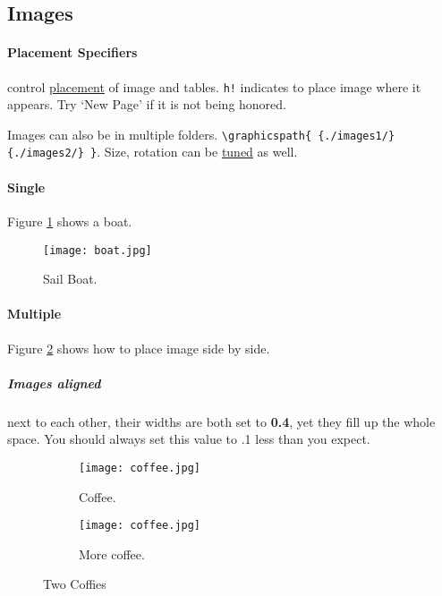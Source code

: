 \documentclass{report}[a4paper,12pt] %
\begin{document}
\newpage
\subsection{Images}

\paragraph{Placement Specifiers} control \href{https://www.overleaf.com/learn/latex/Positioning_images_and_tables#The_figure_environment}{placement} of image and tables.
\verb|h!| indicates to place image where it appears. Try `New Page' if it is not being honored.

Images can also be in multiple folders. \verb|\graphicspath{ {./images1/}{./images2/} }|.
Size, rotation can be \href{https://www.overleaf.com/learn/latex/Inserting_Images}{tuned} as well.

\paragraph{Single}

Figure \ref{fig:sailboat} shows a boat. %

\begin{figure}[h]
  \texttt{[image: boat.jpg]}
  \caption{Sail Boat.}
  \label{fig:sailboat} %
\end{figure}

\newpage
\paragraph{Multiple}
Figure \ref{fig:coffee} shows how to place image side by side.

\subparagraph{Images aligned} next to each other, their widths are both set to \textbf{0.4}, yet they fill up the whole space.
You should always set this value to .1 less than you expect.

\begin{figure}[h!]
  \centering
  \begin{subfigure}[b]{0.4\linewidth}
    \texttt{[image: coffee.jpg]}
    \caption{Coffee.}
  \end{subfigure}
  \begin{subfigure}[b]{0.4\linewidth}
    \texttt{[image: coffee.jpg]}
    \caption{More coffee.}
  \end{subfigure}
  \caption{Two Coffies}
  \label{fig:coffee}
\end{figure}
\end{document}
